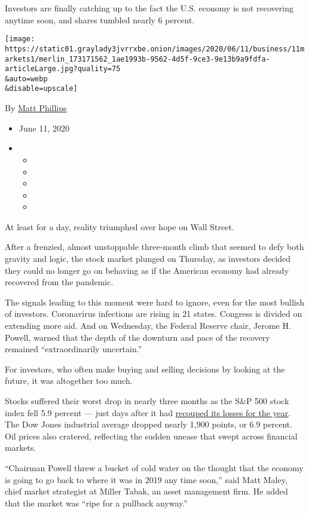 Investors are finally catching up to the fact the U.S. economy is not
recovering anytime soon, and shares tumbled nearly 6 percent.

\texttt{[image: https://static01.graylady3jvrrxbe.onion/images/2020/06/11/business/11markets1/merlin\_173171562\_1ae1993b-9562-4d5f-9ce3-9e13b9a9fdfa-articleLarge.jpg?quality=75\\\&auto=webp\\\&disable=upscale]}

By \href{https://www.nytimes3xbfgragh.onion/by/matt-phillips}{Matt
Phillips}

\begin{itemize}
\item
  June 11, 2020
\item
  \begin{itemize}
  \item
  \item
  \item
  \item
  \item
  \end{itemize}
\end{itemize}

At least for a day, reality triumphed over hope on Wall Street.

After a frenzied, almost unstoppable three-month climb that seemed to
defy both gravity and logic, the stock market plunged on Thursday, as
investors decided they could no longer go on behaving as if the American
economy had already recovered from the pandemic.

The signals leading to this moment were hard to ignore, even for the
most bullish of investors. Coronavirus infections are rising in 21
states. Congress is divided on extending more aid. And on Wednesday, the
Federal Reserve chair, Jerome H. Powell, warned that the depth of the
downturn and pace of the recovery remained ``extraordinarily
uncertain.''

For investors, who often make buying and selling decisions by looking at
the future, it was altogether too much.

Stocks suffered their worst drop in nearly three months as the S\&P 500
stock index fell 5.9 percent --- just days after it had
\href{https://www.nytimes3xbfgragh.onion/2020/06/08/business/recession-stock-market-coronavirus.html}{recouped
its losses for the year}. The Dow Jones industrial average dropped
nearly 1,900 points, or 6.9 percent. Oil prices also cratered,
reflecting the sudden unease that swept across financial markets.

``Chairman Powell threw a bucket of cold water on the thought that the
economy is going to go back to where it was in 2019 any time soon,''
said Matt Maley, chief market strategist at Miller Tabak, an asset
management firm. He added that the market was ``ripe for a pullback
anyway.''

